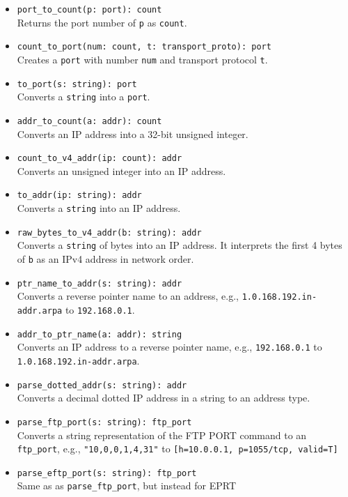 \documentclass[10pt,landscape]{article}
\newcommand{\verbose}[1]{#1}
\newcommand{\verbose}[1]{}
\begin{document}
\begin{multicols*}{2}
\begin{itemize}
  \item \verb|port_to_count(p: port): count|\\
    Returns the port number of \texttt{p} as \texttt{count}.
  \item \verb|count_to_port(num: count, t: transport_proto): port|\\
    Creates a \texttt{port} with number \texttt{num} and transport protocol
    \texttt{t}.
  \item \verb|to_port(s: string): port|\\
    Converts a \texttt{string} into a \texttt{port}.
  \item \verb|addr_to_count(a: addr): count|\\
    Converts an IP address into a 32-bit unsigned integer.
  \item \verb|count_to_v4_addr(ip: count): addr|\\
    Converts an unsigned integer into an IP address.
  \item \verb|to_addr(ip: string): addr|\\
    Converts a \texttt{string} into an IP address.
  \item \verb|raw_bytes_to_v4_addr(b: string): addr|\\
    Converts a \texttt{string} of bytes into an IP address. It interprets the
    first 4 bytes of \texttt{b} as an IPv4 address in network order.
  \item \verb|ptr_name_to_addr(s: string): addr|\\
    Converts a reverse pointer name to an address, e.g.,
    \verb|1.0.168.192.in-addr.arpa| to \verb|192.168.0.1|.
  \item \verb|addr_to_ptr_name(a: addr): string|\\
    Converts an IP address to a reverse pointer name, e.g.,
    \verb|192.168.0.1| to \verb|1.0.168.192.in-addr.arpa|.
  \item \verb|parse_dotted_addr(s: string): addr|\\
    Converts a decimal dotted IP address in a string to an address type.
\verbose{
  \item \verb|parse_ftp_port(s: string): ftp_port|\\
    Converts a string representation of the FTP PORT command to an
    \verb|ftp_port|,
    e.g., \verb|"10,0,0,1,4,31"| to \verb|[h=10.0.0.1, p=1055/tcp, valid=T]|
  \item \verb|parse_eftp_port(s: string): ftp_port|\\
    Same as as \verb|parse_ftp_port|, but instead for EPRT
}
\end{itemize}
\end{multicols*}
\end{document}

